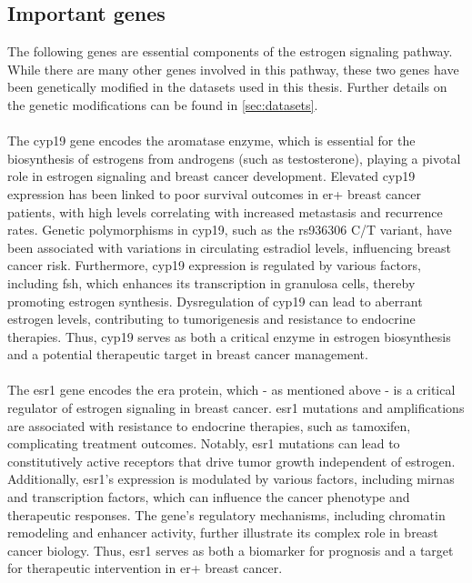 \subsection{Important genes}

The following genes are essential components of the estrogen signaling pathway.
While there are many other genes involved in this pathway, these two genes have
been genetically modified in the datasets used in this thesis.
Further details on the genetic modifications can be found in
\cref{sec:datasets}.

\paragraph{}
The \gls{cyp19} gene encodes the aromatase enzyme, which is essential for the
biosynthesis of estrogens from androgens (such as testosterone), playing a
pivotal role in estrogen signaling and breast cancer development.
Elevated \gls{cyp19} expression has been linked to poor survival outcomes in
\gls{er+} breast cancer patients, with high levels correlating with increased
metastasis and recurrence
rates\supercite{barros-oliveira_cyp19a1_2020,friesenhengst_elevated_2018}.
Genetic polymorphisms in \gls{cyp19}, such as the rs936306 C/T variant, have
been associated with variations in circulating estradiol levels, influencing
breast cancer risk\supercite{ghosh_potential_2012}.
Furthermore, \gls{cyp19} expression is regulated by various factors, including
\gls{fsh}, which enhances its transcription in granulosa cells, thereby
promoting estrogen
synthesis\supercite{savolainen-peltonen_estrogen_2018,li_microrna-7a2_2022}.
Dysregulation of \gls{cyp19} can lead to aberrant estrogen levels, contributing
to tumorigenesis and resistance to endocrine
therapies\supercite{dabydeen_comparison_2015}.
Thus, \gls{cyp19} serves as both a critical enzyme in estrogen biosynthesis and
a potential therapeutic target in breast cancer management.

\paragraph{}
The \gls{esr1} gene encodes the \gls{era} protein, which - as mentioned above -
is a critical regulator of estrogen signaling in breast cancer.
\Gls{esr1} mutations and amplifications are associated with resistance to
endocrine
therapies, such as tamoxifen, complicating treatment
outcomes\supercite{aguilar_biological_2010,jeselsohn_emergence_2014}.
Notably, \gls{esr1} mutations can lead to constitutively active receptors that
drive tumor growth independent of estrogen\supercite{toy_activating_2017}.
Additionally, \gls{esr1}'s expression is modulated by various factors,
including \glspl{mirna} and transcription factors, which can influence the
cancer phenotype and therapeutic responses\supercite{mansoori_mir-142-3p_2019}.
The gene's regulatory mechanisms, including chromatin remodeling and enhancer
activity, further illustrate its complex role in breast cancer
biology\supercite{powers_proteasome_2013,tomita_cluster_2015}.
Thus, \gls{esr1} serves as both a biomarker for prognosis and a target for
therapeutic intervention in \gls{er+} breast cancer.
